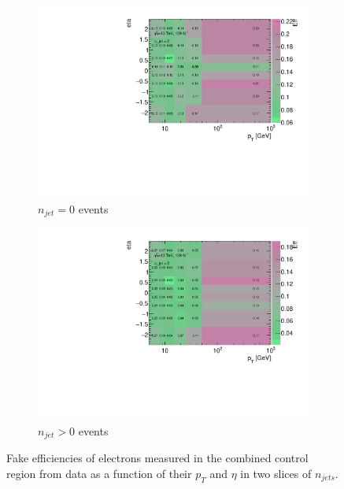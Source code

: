 \begin{figure}[!htbp]
    \begin{center}
        \begin{subfigure}{.49\textwidth}
            \centering
            \includegraphics[width=.95\linewidth]{figures/Analysis/Background/njet0_FakeEfficiency3D_el_pt_eta.pdf}
            \caption{$n_{jet}=0$ events \label{fig:FakeEff_3D_Elec_njet0}}
        \end{subfigure}
        \begin{subfigure}{.49\textwidth}
            \centering
            \includegraphics[width=.95\linewidth]{figures/Analysis/Background/njet1_FakeEfficiency3D_el_pt_eta.pdf}
            \caption{$n_{jet}>0$ events \label{fig:FakeEff_3D_Elec_njet1}}
        \end{subfigure}
    \end{center}
    \caption{Fake efficiencies of electrons measured in the combined control region from data as a function of their $p_{T}$ and $\eta$ in two slices of $n_{jets}$. \label{fig:ElecFakeEff}}
\end{figure}

